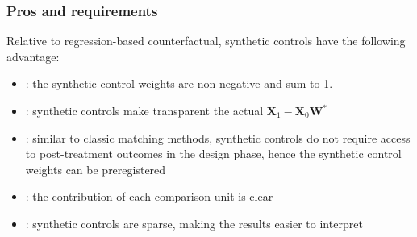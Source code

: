 \documentclass[twoside]{article}
\begin{document}
\subsubsection{Pros and requirements}

Relative to regression-based counterfactual, synthetic controls have the following advantage:
\begin{itemize}
    \item {}: the synthetic control weights are non-negative and sum to 1.
    \item {}: synthetic controls make transparent the actual $\mathbf{X}_1-\mathbf{X}_0\mathbf{W}^*$
    \item {}: similar to classic matching methods, synthetic controls do not require access to post-treatment outcomes in the design phase, hence the synthetic control weights can be preregistered
    \item {}: the contribution of each comparison unit is clear
    \item {}: synthetic controls are sparse, making the results easier to interpret
\end{itemize}
\end{document}
